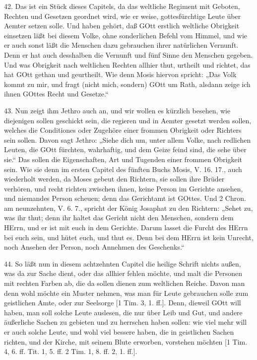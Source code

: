 42. Das ist ein Stück dieses Capitels, da das weltliche Regiment mit Geboten, Rechten und Gesetzen geordnet wird, wie er weise, gottesfürchtige Leute über Aemter setzen solle. Und haben gehört, daß GOtt erstlich weltliche Obrigkeit einsetzen läßt bei diesem Volke, ohne sonderlichen Befehl vom Himmel, und wie er auch sonst läßt die Menschen dazu gebrauchen ihrer natürlichen Vernunft. Denn er hat auch desshalben die Vernunft und fünf Sinne den Menschen gegeben. Und was Obrigkeit nach weltlichen Rechten allhier thut, urtheilt und richtet, das hat GOtt gethan und geurtheilt. Wie denn Mosis hiervon spricht: „Das Volk kommt zu mir, und fragt (nicht mich, sondern) GOtt um Rath, alsdann zeige ich ihnen GOttes Recht und Gesetze.“

43. Nun zeigt ihm Jethro auch an, und wir wollen es kürzlich besehen, wie diejenigen sollen geschickt sein, die regieren und in Aemter gesetzt werden sollen, welches die Conditiones oder Zugehöre einer frommen Obrigkeit oder Richters sein sollen. Davon sagt Jethro: „Siehe dich um, unter allem Volke, nach redlichen Leuten, die GOtt fürchten, wahrhaftig, und dem Geize feind sind, die sehe über sie.“ Das sollen die Eigenschaften, Art und Tugenden einer frommen Obrigkeit sein. Wie sie denn im ersten Capitel des fünften Buchs Mosis, V. 16. 17., auch wiederholt werden, da Moses gebeut den Richtern, sie sollen ihre Brüder verhören, und recht richten zwischen ihnen, keine Person im Gerichte ansehen, und niemandes Person scheuen; denn das Gerichtamt ist GOttes. Und 2 Chron. am neunzehnten, V. 6. 7., spricht der König Josaphat zu den Richtern: „Sehet zu, was ihr thut; denn ihr haltet das Gericht nicht den Menschen, sondern dem HErrn, und er ist mit euch in dem Gerichte. Darum lasset die Furcht des HErrn bei euch sein, und hütet euch, und thut es. Denn bei dem HErrn ist kein Unrecht, noch Ansehen der Person, noch Annehmen des Geschenks.“

44. So läßt nun in diesem achtzehnten Capitel die heilige Schrift nichts außen, was da zur Sache dient, oder das allhier fehlen möchte, und malt die Personen mit rechten Farben ab, die da sollen dienen zum weltlichen Reiche. Davon man denn wohl möchte ein Muster nehmen, was man für Leute gebrauchen solle zum geistlichen Amte, oder zur Seelsorge [1 Tim. 3, 1. ff.]. Denn, dieweil GOtt will haben, man soll solche Leute auslesen, die nur über Leib und Gut, und andere äußerliche Sachen zu gebieten und zu herrschen haben sollen: wie viel mehr will er auch solche Leute, und wohl viel bessere haben, die in geistlichen Sachen richten, und der Kirche, mit seinem Blute erworben, vorstehen möchten [1 Tim. 4, 6. ff. Tit. 1, 5. ff. 2 Tim. 1, 8. ff. 2, 1. ff.].

